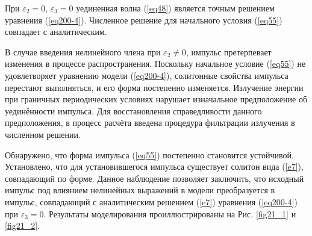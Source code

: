 \documentclass[12pt,a4paper]{article}
\begin{document}
	При \(\varepsilon_{2}=0,\,\varepsilon_{3}=0\) уединенная волна (\ref{eq48}) является точным решением уравнения (\ref{eq200-4}). Численное решение для начального условия (\ref{eq55}) совпадает с аналитическим.

	В случае введения нелинейного члена при \(\varepsilon_{2}\ne 0\), импульс претерпевает изменения в процессе распространения. Поскольку начальное условие (\ref{eq55}) не удовлетворяет уравнению модели (\ref{eq200-4}), солитонные свойства импульса перестают выполняться, и его форма постепенно изменяется. Излучение энергии при граничных периодических условиях нарушает изначальное предположение об уединённости импульса. Для восстановления справедливости данного предположения, в процесс расчёта введена процедура фильтрации излучения в численном решении.

	Обнаружено, что форма импульса (\ref{eq55}) постепенно становится устойчивой. Установлено, что для установившегося импульса существует солитон вида (\ref{e7}), совпадающий по форме. Данное наблюдение позволяет заключить, что исходный импульс под влиянием нелинейных выражений в модели преобразуется в импульс, совпадающий с аналитическим решением (\ref{e7}) уравнения (\ref{eq200-4}) при \(\varepsilon_{3}=0\). Результаты моделирования проиллюстрированы на Рис. \ref{fig21_1} и \ref{fig21_2}.
\end{document}
